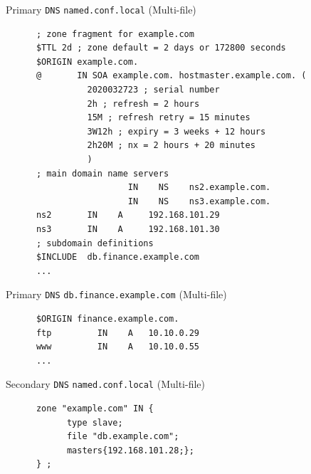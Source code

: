\documentclass[xcolor=table]{beamer}
\begin{document}
\begin{frame}[fragile]{Primary \texttt{DNS} \texttt{named.conf.local} (Multi-file)}
  \begin{tcolorbox}
    \lstset{
      basicstyle=\tiny\ttfamily,
    }
    \begin{lstlisting}
      ; zone fragment for example.com
      $TTL 2d ; zone default = 2 days or 172800 seconds
      $ORIGIN example.com.
      @	      IN SOA example.com. hostmaster.example.com. (
                2020032723 ; serial number
                2h ; refresh = 2 hours
                15M ; refresh retry = 15 minutes
                3W12h ; expiry = 3 weeks + 12 hours
                2h20M ; nx = 2 hours + 20 minutes
                )
      ; main domain name servers
                        IN    NS 	ns2.example.com.
                        IN    NS 	ns3.example.com.
      ns2 		IN    A 	192.168.101.29
      ns3 		IN    A 	192.168.101.30
      ; subdomain definitions
      $INCLUDE	db.finance.example.com
      ...
    \end{lstlisting}
  \end{tcolorbox}
\end{frame}

\begin{frame}[fragile]{Primary \texttt{DNS} \texttt{db.finance.example.com} (Multi-file)}
  \begin{tcolorbox}
    \lstset{
      basicstyle=\tiny\ttfamily,
    }
    \begin{lstlisting}
      $ORIGIN finance.example.com.
      ftp 		  IN    A   10.10.0.29
      www		  IN    A   10.10.0.55
      ...
    \end{lstlisting}
  \end{tcolorbox}
\end{frame}

\begin{frame}[fragile]{Secondary \texttt{DNS} \texttt{named.conf.local} (Multi-file)}
  \begin{tcolorbox}
    \lstset{
      basicstyle=\tiny\ttfamily,
    }
    \begin{lstlisting}
      zone "example.com" IN {
	        type slave;
	        file "db.example.com";
	        masters{192.168.101.28;};
      } ;
    \end{lstlisting}
  \end{tcolorbox}
\end{frame}
\end{document}
